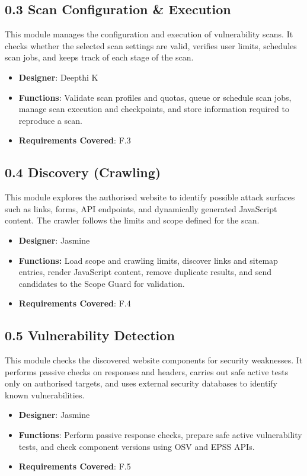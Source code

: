 \documentclass[11pt,a4paper]{article}
\begin{document}
\subsection{0.3 Scan Configuration \& Execution}
This module manages the configuration and execution of vulnerability scans. It checks whether the selected scan settings are valid, verifies user limits, schedules scan jobs, and keeps track of each stage of the scan.
\begin{itemize}[noitemsep]
    \item \textbf{Designer}: Deepthi K
    \item \textbf{Functions}: Validate scan profiles and quotas, queue or schedule scan jobs, manage scan execution and checkpoints, and store information required to reproduce a scan.
    \item \textbf{Requirements Covered}: F.3
\end{itemize}

\subsection{0.4 Discovery (Crawling)}
This module explores the authorised website to identify possible attack surfaces such as links, forms, API endpoints, and dynamically generated JavaScript content. The crawler follows the limits and scope defined for the scan.
\begin{itemize}[noitemsep]
    \item \textbf{Designer}: Jasmine
    \item \textbf{Functions:}\newline
    Load scope and crawling limits, discover links and sitemap entries, render JavaScript content, remove duplicate results, and send candidates to the Scope Guard for validation.
    \item \textbf{Requirements Covered}: F.4
\end{itemize}

\subsection{0.5 Vulnerability Detection}
This module checks the discovered website components for security weaknesses. It performs passive checks on responses and headers, carries out safe active tests only on authorised targets, and uses external security databases to identify known vulnerabilities.
\begin{itemize}[noitemsep]
    \item \textbf{Designer}: Jasmine
    \item \textbf{Functions}: Perform passive response checks, prepare safe active vulnerability tests, and check component versions using OSV and EPSS APIs.
    \item \textbf{Requirements Covered}: F.5
\end{itemize}
\end{document}
